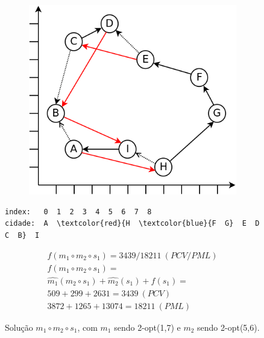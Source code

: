 \begin{figure}[ht]
    \begin{minipage}{.475\textwidth}
        \begin{subfigure}[t]{1\textwidth} %
            \includegraphics[width=1\linewidth]{figuras/pml/exemplo-rodolfo-2opt-1-7-5-6.png}
        \end{subfigure}
    \end{minipage}
    \begin{minipage}{.475\textwidth}
\begin{Verbatim}[commandchars=\\\{\}]
index:   0  1  2  3  4  5  6  7  8
cidade:  A  \textcolor{red}{H  \textcolor{blue}{F  G}  E  D  C  B}  I
\end{Verbatim}
\begin{gather*}
f(m_1 \circ m_2 \circ s_1)= 3439/18211 \ (PCV/PML) \\
f(m_1 \circ m_2 \circ s_1) = \\
\widehat{m_1}(m_2 \circ s_1) + \widehat{m_2}(s_1) + f(s_1) = \\
509 + 299 + 2631 = 3439 \ (PCV) \\
3872 + 1265 + 13074 = 18211 \ (PML)
\end{gather*}
    \end{minipage}
    \caption{Solução $m_1 \circ m_2 \circ s_1$, com $m_1$ sendo 2-opt(1,7) e $m_2$ sendo 2-opt(5,6).}
    \label{fig:figuraExemplo_m1m2s1}
\end{figure}

